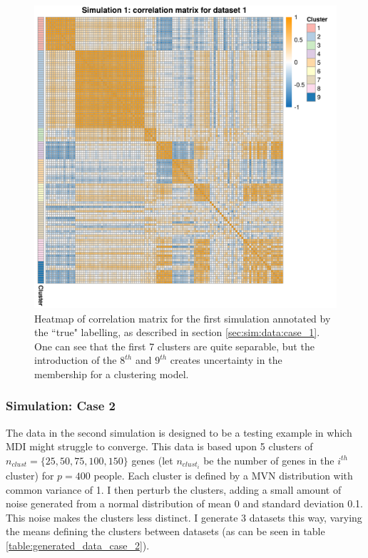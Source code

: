 \documentclass[12pt]{article} %
\begin{document}
	\begin{figure}[!htb]
		\centering
		\includegraphics[scale=0.65]{Images/Gen_data/Case_1/cor_matrix_dataset_1.png}
		\caption{Heatmap of correlation matrix for the first simulation annotated by the ``true" labelling, as described in section \ref{sec:sim:data:case_1}. One can see that the first 7 clusters are quite separable, but the introduction of the $8^{th}$ and $9^{th}$ creates uncertainty in the membership for a clustering model.}
		\label{fig:cor_matrix_1_sim_case_1}
	\end{figure}
	
	\subsubsection{Simulation: Case 2} \label{sec:sim:data:case_2}
	The data in the second simulation is designed to be a testing example in which MDI might struggle to converge. This data is based upon 5 clusters of $n_{clust}=\{25, 50, 75, 100, 150\}$ genes (let $n_{clust_i}$ be the number of genes in the $i^{th}$ cluster) for $p=400$ people. Each cluster is defined by a MVN distribution with common variance of 1. I then perturb the clusters, adding a small amount of noise generated from a normal distribution of mean 0 and standard deviation 0.1. This noise makes the clusters less distinct. I generate 3 datasets this way, varying the means defining the clusters between datasets (as can be seen in table \ref{table:generated_data_case_2}).
	
\end{document}
